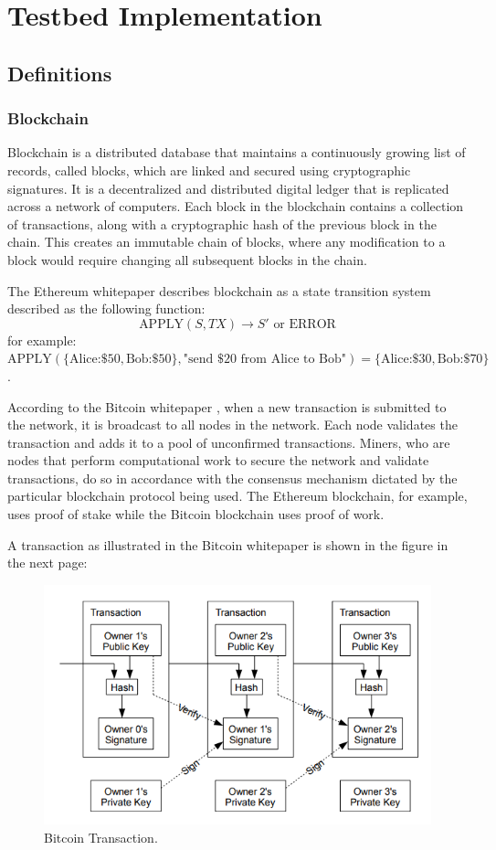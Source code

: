\documentclass{article}
\begin{document}
\section{Testbed Implementation}
\subsection{Definitions}

\subsubsection{Blockchain}
Blockchain is a distributed database that maintains a continuously growing list of records, called blocks, which are linked and secured using cryptographic signatures. It is a decentralized and distributed digital ledger that is replicated across a network of computers. Each block in the blockchain contains a collection of transactions, along with a cryptographic hash of the previous block in the chain. This creates an immutable chain of blocks, where any modification to a block would require changing all subsequent blocks in the chain.

The Ethereum whitepaper \cite{ethereumWhitepaper} describes blockchain as a state transition system described as the following function:
\[
\text{APPLY}(S,TX) \to S' \text{ or ERROR}
\]
for example: \(\text{APPLY}(\{ \text{Alice:} \$50, \text{Bob:} \$50 \}, \text{"send \$20 from Alice to Bob"}) = \{ \text{Alice:} \$30, \text{Bob:} \$70 \}\).

According to the Bitcoin whitepaper \cite{bitcoinWhitepaper}, when a new transaction is submitted to the network, it is broadcast to all nodes in the network. Each node validates the transaction and adds it to a pool of unconfirmed transactions. Miners, who are nodes that perform computational work to secure the network and validate transactions, do so in accordance with the consensus mechanism dictated by the particular blockchain protocol being used. The Ethereum blockchain, for example, uses proof of stake while the Bitcoin blockchain uses proof of work.

A transaction as illustrated in the Bitcoin whitepaper is shown in the figure in the next page:
\begin{figure}[H]
    \centering
    \includegraphics[width=\textwidth]{transaction_btcWp.png}
    \caption{Bitcoin Transaction.\cite{bitcoinWhitepaper}}
\end{figure}
\end{document}
